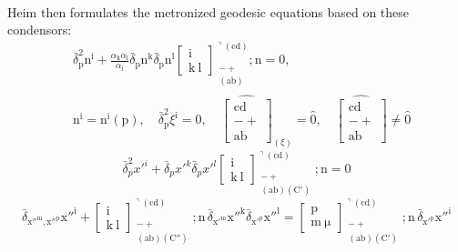 \documentclass[12pt]{article}
\begin{document}
\begin{itemize}
\begin{equation}
\begin{aligned}
    \end{aligned} \tag{92a}
    \end{equation}
    Heim then formulates the metronized geodesic equations based on these condensors:
    \begin{equation}
    \begin{aligned}
    & \bar{\delta}_\mathrm{p}^2 \mathrm{n^i} + \frac{\alpha_\mathrm{k}\alpha_\mathrm{l}}{\alpha_\mathrm{i}} \bar{\delta}_\mathrm{p} \mathrm{n^k} \bar{\delta}_\mathrm{p} \mathrm{n^l} \left[ \begin{matrix} \mathrm{i} \\ \mathrm{k\ l} \end{matrix} \right]^{\urcorner(\mathrm{cd})}_{\substack{- + \\ (\mathrm{ab})}} ; \mathrm{n} = 0, \\
    & \mathrm{n^i} = \mathrm{n^i}(\mathrm{p}), \quad \bar{\delta}_\mathrm{p}^2 \xi^\mathrm{i} = 0, \quad \widehat{\left[ \begin{matrix} \mathrm{cd} \\ - + \\ \mathrm{ab} \end{matrix} \right]}_{(\xi)} = \hat{0}, \quad \widehat{\left[ \begin{matrix} \mathrm{cd} \\ - + \\ \mathrm{ab} \end{matrix} \right]} \neq \hat{0}
    \end{aligned} \tag{93}
    \end{equation}
    \begin{equation}
    \bar{\delta}_p^2 x'^i + \bar{\delta}_p x'^k \bar{\delta}_p x'^l \left[ \begin{smallmatrix} \mathrm{i} \\ \mathrm{k\ l} \end{smallmatrix} \right]^{\urcorner(\mathrm{cd})}_{\substack{- + \\ (\mathrm{ab})(\mathrm{C'})}} ; \mathrm{n} = 0 \tag{93a}
    \end{equation}
    \begin{equation}
\bar{\delta}_{{\mathrm{x''}}^{\mathrm{m}}, {\mathrm{x''}}^{\mathrm{p}}} {\mathrm{x''}}^\mathrm{i} + \left[ \begin{smallmatrix} \mathrm{i} \\ \mathrm{k\ l} \end{smallmatrix} \right]^{\urcorner(\mathrm{cd})}_{\substack{- + \\ (\mathrm{ab})(\mathrm{C''})}} ; \mathrm{n} \,\bar{\delta}_{\mathrm{x'^m}} {\mathrm{x''}}^\mathrm{k} \bar{\delta}_{\mathrm{x'^p}} {\mathrm{x''}}^\mathrm{l} = \left[ \begin{smallmatrix} \mathrm{p} \\ \mathrm{m\ \mu} \end{smallmatrix} \right]^{\urcorner(\mathrm{cd})}_{\substack{- + \\ (\mathrm{ab})(\mathrm{C'})}} ; \mathrm{n} \,\bar{\delta}_{\mathrm{x'^p}} {\mathrm{x''}}^\mathrm{i} \tag{93b}

\end{equation}
\end{itemize}
\end{document}
